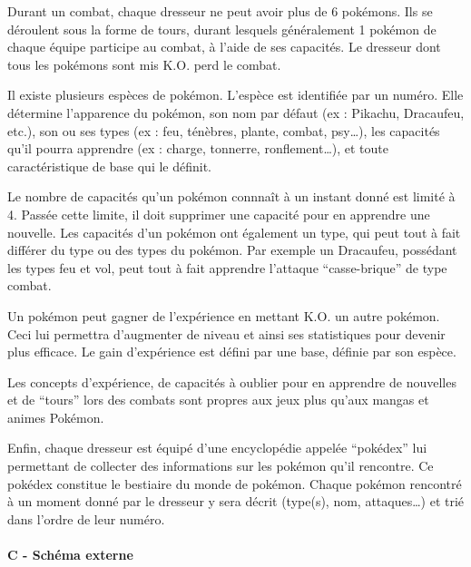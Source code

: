 Durant un combat, chaque dresseur ne peut avoir plus de 6 pokémons. Ils se déroulent sous la forme de tours, durant lesquels généralement 1 pokémon de chaque équipe participe au combat, à l’aide de ses capacités. Le dresseur dont tous les pokémons sont mis K.O. perd le combat.

Il existe plusieurs espèces de pokémon. L’espèce est identifiée par un numéro. Elle détermine l’apparence du pokémon, son nom par défaut (ex : Pikachu, Dracaufeu, etc.), son ou ses types (ex : feu, ténèbres, plante, combat, psy…), les capacités qu’il pourra apprendre (ex : charge, tonnerre, ronflement…), et toute caractéristique de base qui le définit.

Le nombre de capacités qu’un pokémon connnaît à un instant donné est limité à 4. Passée cette limite, il doit supprimer une capacité pour en apprendre une nouvelle. Les capacités d’un pokémon ont également un type, qui peut tout à fait différer du type ou des types du pokémon. Par exemple un Dracaufeu, possédant les types feu et vol, peut tout à fait apprendre l’attaque “casse-brique” de type combat.

Un pokémon peut gagner de l’expérience en mettant K.O. un autre pokémon. Ceci lui permettra d’augmenter de niveau et ainsi ses statistiques pour devenir plus efficace. Le gain d’expérience est défini par une base, définie par son espèce.

Les concepts d’expérience, de capacités à oublier pour en apprendre de nouvelles et de “tours” lors des combats sont propres aux jeux plus qu’aux mangas et animes Pokémon.

Enfin, chaque dresseur est équipé d’une encyclopédie appelée “pokédex” lui permettant de collecter des informations sur les pokémon qu’il rencontre. Ce pokédex constitue le bestiaire du monde de pokémon. Chaque pokémon rencontré à un moment donné par le dresseur y sera décrit (type(s), nom, attaques…) et trié dans l’ordre de leur numéro.

\paragraph{C - Schéma externe}
\hspace{0pt}

